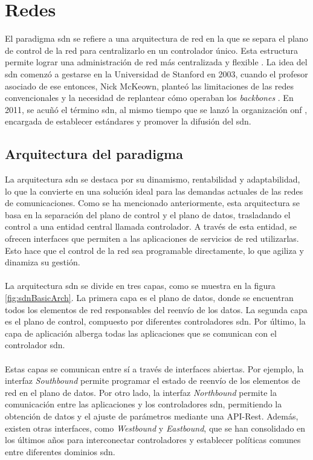 \section{Redes  }
\label{sec:sdn}


El paradigma \gls{sdn} \cite{nadeau2013sdn} se refiere a una arquitectura de red en la que se separa el plano de control de la red para centralizarlo en un controlador único. Esta estructura permite lograr una administración de red más centralizada y flexible \cite{nadeau2013sdn}. La idea del \gls{sdn} comenzó a gestarse en la Universidad de Stanford en 2003, cuando el profesor asociado de ese entonces, Nick McKeown, planteó las limitaciones de las redes convencionales y la necesidad de replantear cómo operaban los \textit{backbones} \cite{sdnBegins}. En 2011, se acuñó el término \gls{sdn}, al mismo tiempo que se lanzó la organización \gls{onf} \cite{onf}, encargada de establecer estándares y promover la difusión del \gls{sdn}.

\subsection{Arquitectura del paradigma }

La arquitectura \gls{sdn} se destaca por su dinamismo, rentabilidad y adaptabilidad, lo que la convierte en una solución ideal para las demandas actuales de las redes de comunicaciones. Como se ha mencionado anteriormente, esta arquitectura se basa en la separación del plano de control y el plano de datos, trasladando el control a una entidad central llamada controlador. A través de esta entidad, se ofrecen interfaces que permiten a las aplicaciones de servicios de red utilizarlas. Esto hace que el control de la red sea programable directamente, lo que agiliza y dinamiza su gestión.\\
\\
La arquitectura \gls{sdn} se divide en tres capas, como se muestra en la figura \ref{fig:sdnBasicArch}. La primera capa es el plano de datos, donde se encuentran todos los elementos de red responsables del reenvío de los datos. La segunda capa es el plano de control, compuesto por diferentes controladores \gls{sdn}. Por último, la capa de aplicación alberga todas las aplicaciones que se comunican con el controlador \gls{sdn}.\\
\\
Estas capas se comunican entre sí a través de interfaces abiertas. Por ejemplo, la interfaz \textit{Southbound} permite programar el estado de reenvío de los elementos de red en el plano de datos. Por otro lado, la interfaz \textit{Northbound} permite la comunicación entre las aplicaciones y los controladores \gls{sdn}, permitiendo la obtención de datos y el ajuste de parámetros mediante una API-Rest. Además, existen otras interfaces, como \textit{Westbound} y \textit{Eastbound}, que se han consolidado en los últimos años para interconectar controladores y establecer políticas comunes entre diferentes dominios \gls{sdn}.\\

